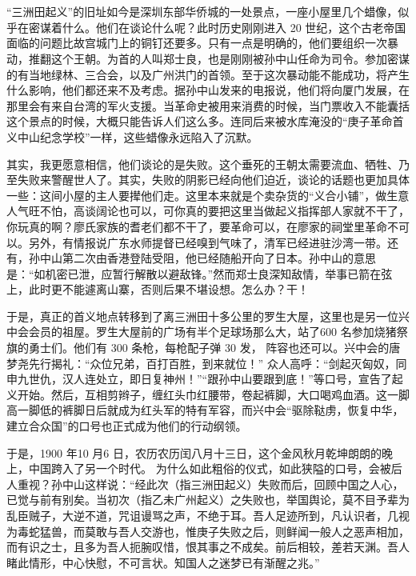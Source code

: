 \chapter{}

“三洲田起义”的旧址如今是深圳东部华侨城的一处景点，一座小屋里几个蜡像，似乎在密谋着什么。他们在谈论什么呢？此时历史刚刚进入 20 世纪，这个古老帝国面临的问题比故宫城门上的铜钉还要多。只有一点是明确的，他们要组织一次暴动，推翻这个王朝。为首的人叫郑士良，也是刚刚被孙中山任命为司令。参加密谋的有当地绿林、三合会，以及广州洪门的首领。至于这次暴动能不能成功，将产生什么影响，他们都还来不及考虑。据孙中山发来的电报说，他们将向厦门发展，在那里会有来自台湾的军火支援。当革命史被用来消费的时候，当门票收入不能囊括这个景点的时候，大概只能告诉人们这么多。连同后来被水库淹没的“庚子革命首义中山纪念学校”一样，这些蜡像永远陷入了沉默。

其实，我更愿意相信，他们谈论的是失败。这个垂死的王朝太需要流血、牺牲、乃至失败来警醒世人了。其实，失败的阴影已经向他们迫近，谈论的话题也更加具体一些：这间小屋的主人要撵他们走。这里本来就是个卖杂货的“义合小铺”，做生意人气旺不怕，高谈阔论也可以，可你真的要把这里当做起义指挥部人家就不干了，你玩真的啊？廖氏家族的耆老们都不干了，要革命可以，在廖家的祠堂里革命不可以。另外，有情报说广东水师提督已经嗅到气味了，清军已经进驻沙湾一带。还有，孙中山第二次由香港登陆受阻，他已经随船开向了日本。孙中山的意思是：“如机密已泄，应暂行解散以避敌锋。”然而郑士良深知敌情，举事已箭在弦上，此时更不能遽离山寨，否则后果不堪设想。怎么办？干！

于是，真正的首义地点转移到了离三洲田十多公里的罗生大屋，这里也是另一位兴中会会员的祖屋。罗生大屋前的广场有半个足球场那么大，站了600 名参加烧猪祭旗的勇士们。他们有 300 条枪，每枪配子弹 30 发， 阵容也还可以。兴中会的唐梦尧先行揭礼：“众位兄弟，百打百胜，到来就位！” 众人高呼：“剑起灭匈奴，同申九世仇，汉人连处立，即日复神州！”“跟孙中山要跟到底！”等口号，宣告了起义开始。然后，互相剪辫子，缠红头巾红腰带，卷起裤脚，大口喝鸡血酒。这一脚高一脚低的裤脚日后就成为红头军的特有军容，而兴中会“驱除鞑虏，恢复中华，建立合众国”的口号也正式成为他们的行动纲领。

于是，1900 年10 月6 日，农历农历闰八月十三日，这个金风秋月乾坤朗朗的晚上，中国跨入了另一个时代。 为什么如此粗俗的仪式，如此狭隘的口号，会被后人重视？孙中山这样说：“经此次（指三洲田起义）失败而后，回顾中国之人心，已觉与前有别矣。当初次（指乙未广州起义）之失败也，举国舆论，莫不目予辈为乱臣贼子，大逆不道，咒诅谩骂之声，不绝于耳。吾人足迹所到，凡认识者，几视为毒蛇猛兽，而莫敢与吾人交游也，惟庚子失败之后，则鲜闻一般人之恶声相加，而有识之士，且多为吾人扼腕叹惜，恨其事之不成矣。前后相较，差若天渊。吾人睹此情形，中心快慰，不可言状。知国人之迷梦已有渐醒之兆。”

